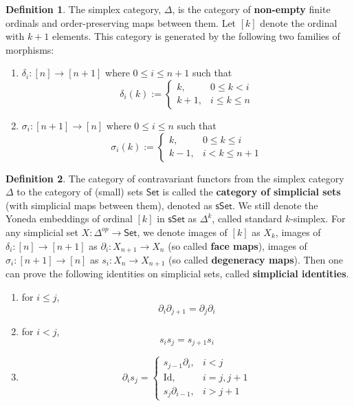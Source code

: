 \documentclass{article}
\theoremstyle{definition}
\newtheorem{mydef}{Definition}[section]
\theoremstyle{remark}
\begin{document}
\begin{mydef}

The simplex category, $\Delta$, is the category of \textbf{non-empty} finite ordinals and order-preserving maps between them. Let $[k]$ denote the ordinal with $k+1$ elements. This category is generated by the following two families of morphisms:

\begin{enumerate}
    \item $\delta_i: [n] \to [n+1]$ where $0 \leq i \leq n+1$ such that $$ \delta_i(k):= \begin{cases} k, & 0 \leq k < i \\ k+1, & i \leq k \leq n \end{cases} $$
    \item $\sigma_i: [n+1] \to [n]$ where $0 \leq i \leq n$ such that $$ \sigma_i(k):= \begin{cases} k, & 0 \leq k \leq i \\ k-1, & i < k \leq n+1 \end{cases} $$
\end{enumerate}

\end{mydef}

\begin{mydef}

The category of contravariant functors from the simplex category $\Delta$ to the category of (small) sets $\mathsf{Set}$ is called the \textbf{category of simplicial sets} (with simplicial maps between them), denoted as $\mathsf{sSet}$. We still denote the Yoneda embeddings of ordinal $[k]$ in $\mathsf{sSet}$ as $\Delta^k$, called standard $k$-simplex. For any simplicial set $X: \Delta^{op} \to \mathsf{Set}$, we denote images of $[k]$ as $X_k$, images of $\delta_i: [n] \to [n+1]$ as $\partial_i: X_{n+1} \to X_n$ (so called \textbf{face maps}), images of $\sigma_i: [n+1] \to [n]$ as $s_i: X_n \to X_{n+1}$ (so called \textbf{degeneracy maps}). Then one can prove the following identities on simplicial sets, called \textbf{simplicial identities}.

\begin{enumerate}
    \item for $i \leq j$, $$ \partial_i \partial_{j+1} = \partial_j \partial_i $$
    \item for $i < j$, $$ s_i s_j = s_{j+1} s_i $$
    \item $$ \partial_i s_j = \begin{cases} s_{j-1} \partial_i, & i<j \\ \mathrm{Id}, & i=j,j+1 \\ s_j \partial_{i-1}, & i>j+1 \end{cases}$$
\end{enumerate}

\end{mydef}
\end{document}
